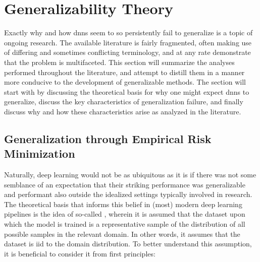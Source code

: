 \section{Generalizability Theory} \label{gen_theory}
	Exactly why and how \glspl{dnn} seem to so persistently fail to generalize is a topic of ongoing research. The available literature is fairly fragmented, often making use of differing and sometimes conflicting terminology, and at any rate demonstrate that the problem is multifaceted. This section will summarize the analyses performed throughout the literature, and attempt to distill them in a manner more conducive to the development of generalizable methods. The section will start with by discussing the theoretical basis for why one might expect \glspl{dnn} to generalize, discuss the key characteristics of generalization failure, and finally discuss why and how these characteristics arise as analyzed in the literature.
	
	\subsection{Generalization through Empirical Risk Minimization} 
		Naturally, deep learning would not be as ubiquitous as it is if there was not some semblance of an expectation that their striking performance was generalizable and performant also outside the idealized settings typically involved in research. The theoretical basis that informs this belief in (most) modern deep learning pipelines is the idea of so-called , wherein it is assumed that the dataset upon which the model is trained is a representative sample of the distribution of all possible samples in the relevant domain. In other words, it assumes that the dataset is \gls{iid} to the domain distribution. To better understand this assumption, it is beneficial to consider it from first principles: 
		
